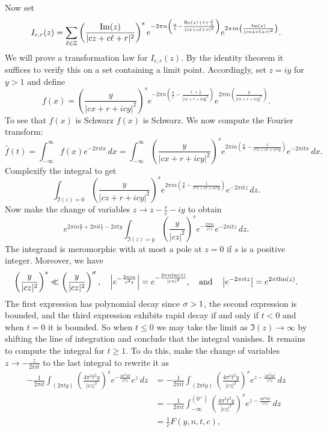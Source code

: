     Now set
    \[
      I_{c,r}(z) = \sum_{\ell \in \mathbb{Z}}\left(\frac{\mathrm{Im}(z)}{|cz+c\ell+r|^{2}}\right)^{s}e^{-2\pi n\left(\frac{a}{c}-\frac{\mathrm{Re}(z)+\ell+\frac{r}{c}}{|cz+c\ell+r|^{2}}\right)}e^{2\pi i n\left(\frac{\mathrm{Im}(z)}{|cz+c\ell+r|^{2}}\right)}.
    \]
    We will prove a transformation law for $I_{c,r}(z)$. By the identity theorem it suffices to verify this on a set containing a limit point. Accordingly, set $z = iy$ for $y > 1$ and define
    \[
      f(x) = \left(\frac{y}{|cx+r+icy|^{2}}\right)^{s}e^{-2\pi n\left(\frac{a}{c}-\frac{\ell+\frac{r}{c}}{|cx+r+icy|^{2}}\right)}e^{2\pi i n\left(\frac{y}{|cx+r+icy|^{2}}\right)}.
    \]
    To see that $f(x)$ is Schwarz  $f(x)$ is Schwarz. We now compute the Fourier transform:
    \[
      \hat{f}(t) = \int_{-\infty}^{\infty}f(x)e^{-2\pi itx}\,dx = \int_{-\infty}^{\infty}\left(\frac{y}{|cx+r+icy|^{2}}\right)^{s}e^{2\pi in\left(\frac{a}{c}-\frac{1}{c^{2}x+cr+ic^{2}y}\right)}e^{-2\pi itx}\,dx.
    \]
    Complexify the integral to get
    \[
      \int_{\Im(z) = 0}\left(\frac{y}{|cz+r+icy|^{2}}\right)^{s}e^{2\pi in\left(\frac{a}{c}-\frac{1}{c^{2}z+cr+ic^{2}y}\right)}e^{-2\pi itz}\,dz.
    \]
    Now make the change of variables $z \to z-\frac{r}{c}-iy$ to obtain
    \[
      e^{2\pi in\frac{a}{c}+2\pi it\frac{r}{c}-2\pi ty}\int_{\Im(z) = y}\left(\frac{y}{|cz|^{2}}\right)^{s}e^{-\frac{2\pi in}{c^{2}z}}e^{-2\pi itz}\,dz.
    \]
    The integrand is meromorphic with at most a pole at $z = 0$ if $s$ is a positive integer. Moreover, we have
    \[
      \left(\frac{y}{|cz|^{2}}\right)^{s} \ll \left(\frac{y}{|cz|^{2}}\right)^{\sigma}, \quad \left|e^{-\frac{2\pi in}{c^{2}z}}\right| = e^{-\frac{2\pi n\mathrm{Im}(z)}{|cz|^{2}}}, \quad \text{and} \quad \left|e^{-2\pi itz}\right| = e^{2\pi t\mathrm{Im}(z)}.
    \]
    The first expression has polynomial decay since $\sigma > 1$, the second expression is bounded, and the third expression exhibits rapid decay if and only if $t < 0$ and when $t = 0$ it is bounded. So when $t \le 0$ we may take the limit as $\Im(z) \to \infty$  by shifting the line of integration and conclude that the integral vanishes. It remains to compute the integral for $t \ge 1$. To do this, make the change of variables $z \to -\frac{z}{2\pi it}$ to the last integral to rewrite it as
    \begin{align*}
      -\frac{1}{2\pi it}\int_{(2\pi ty)}\left(\frac{4\pi^{2}t^{2}y}{|cz|^{2}}\right)^{s}e^{-\frac{4\pi^{2}nt}{c^{2}z}}e^{z}\,dz &= -\frac{1}{2\pi it}\int_{(2\pi ty)}\left(\frac{4\pi^{2}t^{2}y}{|cz|^{2}}\right)^{s}e^{z-\frac{4\pi^{2}nt}{c^{2}z}}\,dz \\
      &= -\frac{1}{2\pi it}\int_{-\infty}^{(0^{+})}\left(\frac{4\pi^{2}t^{2}y}{|cz|^{2}}\right)^{s}e^{z-\frac{4\pi^{2}nt}{c^{2}z}}\,dz \\
      &= \frac{1}{c}F(y,n,t,c),
    \end{align*}
